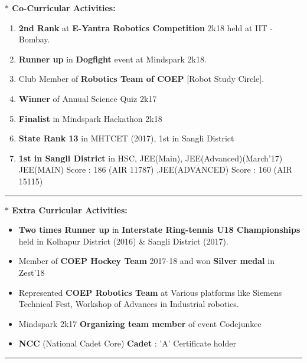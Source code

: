 \documentclass[a4paper,11pt]{article} %
\begin{document}
			\begin{LARGE}
				\textbf{\large $\ast$ Co-Curricular Activities:}\smallskip%
				{\small
					\begin{enumerate}%
						\item \textbf{2nd Rank } at \textbf{E-Yantra Robotics Competition} 2k18 held at IIT - Bombay.
						\item \textbf{Runner up} in \textbf{Dogfight} event at Mindspark 2k18.
						\item Club Member of \textbf{Robotics Team of COEP} [Robot Study Circle].
						\item \textbf{Winner} of Annual Science Quiz 2k17
						\item \textbf{Finalist} in Mindspark Hackathon 2k18
						
						\item \textbf{State Rank 13} in MHTCET (2017), 1st in Sangli District
						\item \textbf{1st in Sangli District} in HSC, JEE(Main), JEE(Advanced)(March'17)\newline
						 JEE(MAIN) Score : 186 (AIR 11787) ,JEE(ADVANCED) Score : 160 (AIR 15115)
						
					\end{enumerate}
				}
			\end{LARGE}
\hrule	
\bigskip

			\begin{LARGE}
				\textbf{\large $\ast$ Extra Curricular Activities:}\medskip%
				{\small
					\begin{itemize}
						\item     \textbf{Two times Runner up} in \textbf{Interstate Ring-tennis U18 Championships} held in Kolhapur District (2016) \& Sangli District (2017).
						\item  Member of \textbf{COEP Hockey Team} 2017-18 and won \textbf{Silver medal} in Zest'18
						\item  Represented \textbf{COEP Robotics Team} at Various platforms like
Siemens Technical Fest, Workshop of Advances in Industrial robotics.
						\item Mindspark 2k17 \textbf{Organizing team member} of event Codejunkee
						\item  \textbf{NCC} (National Cadet Core) \textbf{Cadet} : 'A' Certificate holder
					\end{itemize}
				}
				\bigskip
			\end{LARGE}
\hrule	
\bigskip
\end{document}
